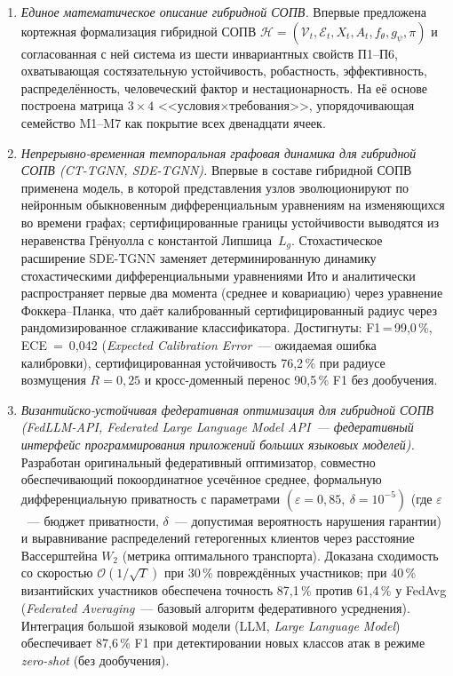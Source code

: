 \documentclass[12pt,a5paper]{article}
\begin{document}
\begin{enumerate}
\item \textit{Единое математическое описание гибридной СОПВ.}
Впервые предложена кортежная формализация гибридной СОПВ
$\mathcal{H} = (\mathcal{V}_t, \mathcal{E}_t, X_t, A_t,
f_\theta, g_\psi, \pi)$ и согласованная с ней система из
шести инвариантных свойств П1--П6, охватывающая
состязательную устойчивость, робастность, эффективность,
распределённость, человеческий фактор и нестационарность.
На её основе построена матрица $3\times4$
<<условия$\times$требования>>, упорядочивающая семейство
M1--M7 как покрытие всех двенадцати ячеек.

\item \textit{Непрерывно-временная темпоральная графовая
динамика для гибридной СОПВ (CT-TGNN, SDE-TGNN).} Впервые в
составе гибридной СОПВ применена модель, в которой
представления узлов эволюционируют по нейронным обыкновенным
дифференциальным уравнениям на изменяющихся во времени
графах; сертифицированные границы устойчивости выводятся из
неравенства Грёнуолла с константой Липшица~$L_g$.
Стохастическое расширение SDE-TGNN заменяет
детерминированную динамику стохастическими дифференциальными
уравнениями Ито и аналитически распространяет первые два
момента (среднее и ковариацию) через уравнение
Фоккера--Планка, что даёт калиброванный сертифицированный
радиус через рандомизированное сглаживание классификатора.
Достигнуты: F1\,=\,99,0\,\%, ECE~=~0,042
(\emph{Expected Calibration Error}~--- ожидаемая ошибка
калибровки), сертифицированная устойчивость 76,2\,\% при
радиусе возмущения $R{=}0{,}25$ и кросс-доменный перенос
90,5\,\% F1 без дообучения.

\item \textit{Византийско-устойчивая федеративная оптимизация
для гибридной СОПВ (FedLLM-API,
\emph{Federated Large Language Model API}~--- федеративный
интерфейс программирования приложений больших языковых
моделей).} Разработан оригинальный федеративный оптимизатор,
совместно обеспечивающий покоординатное усечённое среднее,
формальную дифференциальную приватность с параметрами
$(\varepsilon{=}0{,}85,\ \delta{=}10^{-5})$ (где
$\varepsilon$~--- бюджет приватности, $\delta$~---
допустимая вероятность нарушения гарантии) и выравнивание
распределений гетерогенных клиентов через расстояние
Вассерштейна $W_2$ (метрика оптимального транспорта).
Доказана сходимость со скоростью
$\mathcal{O}(1/\sqrt{T})$ при 30\,\% повреждённых
участников; при 40\,\% византийских участников обеспечена
точность 87,1\,\% против 61,4\,\% у FedAvg
(\emph{Federated Averaging}~--- базовый алгоритм
федеративного усреднения). Интеграция большой языковой
модели (LLM, \emph{Large Language Model}) обеспечивает
87,6\,\% F1 при детектировании новых классов атак в режиме
\emph{zero-shot} (без дообучения).


\end{enumerate}
\end{document}
